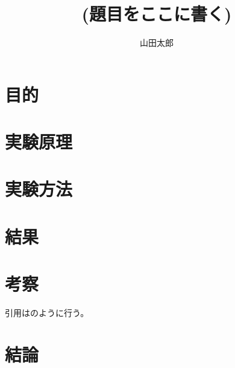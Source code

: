 \documentclass[twocolumn, a4j, 9pt, dvipdfmx]{jsarticle}
\title{{\red(題目をここに書く)}}
\date{}
\author{山田太郎}
\begin{document}
\maketitle

\section{目的}
\section{実験原理}
\section{実験方法}
\section{結果}
\section{考察}
引用は\cite{textbook}のように行う。
\section{結論}





 
\end{document}
